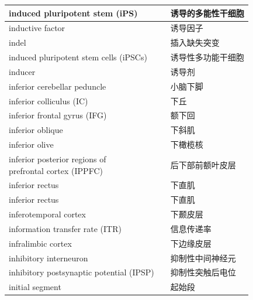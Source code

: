 \begin{longtable}{lll}
	\midrule
	induced pluripotent stem (iPS)  && 诱导的多能性干细胞  \\
	
	\midrule
	inductive factor  && 诱导因子  \\
	
	\midrule
	indel   && 插入缺失突变  \\
	
	\midrule
	induced pluripotent stem cells (iPSCs)  && 诱导性多功能干细胞  \\
	
	\midrule
	inducer  && 诱导剂  \\
	
	\midrule \label{term:inferior_cerebellar_peduncel}
	inferior cerebellar peduncle   && 小脑下脚  \\
	
	\midrule
	inferior colliculus (IC)   && 下丘  \\
	
	\midrule
	inferior frontal gyrus (IFG)   && 额下回  \\
	
	\midrule
	inferior oblique   && 下斜肌  \\
	
	\midrule
	inferior olive   && 下橄榄核  \\
	
	\midrule
	\makecell[l]{inferior posterior regions of \\ prefrontal cortex (IPPFC)}  && 后下部前额叶皮层  \\
	
	\midrule
	inferior rectus   && 下直肌  \\
	
	\midrule
	inferior rectus   && 下直肌  \\
	
	\midrule
	inferotemporal cortex   && 下颞皮层  \\
	
	\midrule
	information transfer rate (ITR)   && 信息传递率  \\
	
	\midrule
	infralimbic cortex   && 下边缘皮层  \\
	
	\midrule
	inhibitory interneuron  && 抑制性中间神经元  \\
	
	\midrule
	inhibitory postsynaptic potential (IPSP)  && 抑制性突触后电位  \\
	
	\midrule
	initial segment && 起始段  \\
	

\end{longtable}
